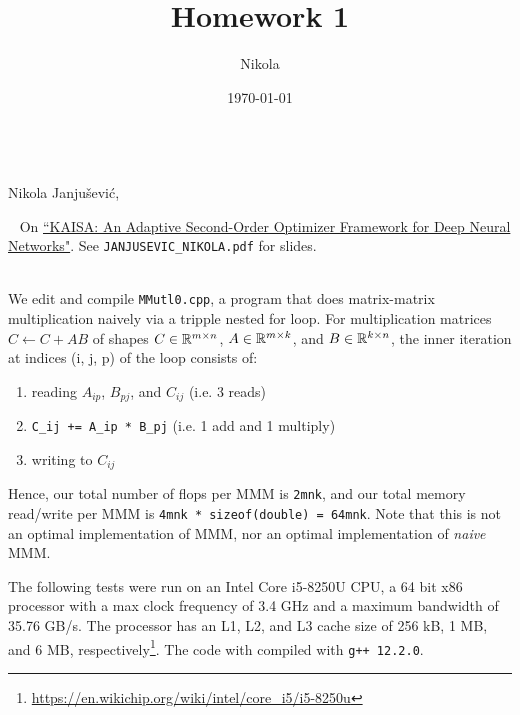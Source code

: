 \documentclass[12pt,reqno]{amsart}
\title{Homework 1}
\author{Nikola} %
\date{\today}
\makeatletter
\let\newtitle\@title
\let\newdate\@date
\makeatother
\begin{document}
\noindent{\bf\normalsize MATH-GA 2012.002, Spring 2023, \newtitle} \\
{\normalsize Nikola Janju\v{s}evi\'{c}, \newdate} \\

\vspace{0.5em}

\begin{problem}[Presentation] ~ 
    On \href{https://arxiv.org/abs/2107.01739}{``KAISA: An Adaptive Second-Order Optimizer Framework for Deep
    Neural Networks"}. See
    \texttt{JANJUSEVIC\_NIKOLA.pdf} for slides.
\end{problem}

\vspace{1em}

\begin{problem} ~ \\
We edit and compile \texttt{MMutl0.cpp}, a program that does 
matrix-matrix multiplication naively via a tripple nested for
loop. For multiplication matrices $C \leftarrow C + AB$ of shapes $C \in
\mathbb R^{m \times n}$, $A \in \mathbb R^{m \times k}$, and $B \in \mathbb R^{k \times n}$, 
the inner iteration at indices (i, j, p) of the loop consists of:

\begin{enumerate}[label=\arabic*), itemsep=0em]
    \item reading $A_{ip}$, $B_{pj}$, and $C_{ij}$ (i.e. 3 reads)
    \item \texttt{C\_ij += A\_ip * B\_pj} (i.e. 1 add and 1 multiply)
    \item writing to $C_{ij}$
\end{enumerate}

Hence, our total number of flops per MMM is \texttt{2mnk}, and our total memory
read/write per MMM is \texttt{4mnk * sizeof(double) = 64mnk}. Note that this is
not an optimal implementation of MMM, nor an optimal implementation of {\it naive}
MMM.

The following tests were run on an Intel Core i5-8250U CPU, a 64 bit x86
processor with a max clock frequency of 3.4 GHz and a maximum bandwidth 
of 35.76 GB/s. The processor has an L1, L2, and L3 cache size of 256 kB, 1 MB,
and 6 MB,
respectively\footnote{\href{https://en.wikichip.org/wiki/intel/core_i5/i5-8250u}{https://en.wikichip.org/wiki/intel/core\_i5/i5-8250u}}.
The code with compiled with \texttt{g++ 12.2.0}. 


\end{problem}
\end{document}
